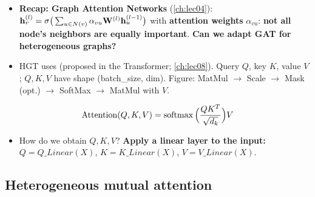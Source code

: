 \begin{itemize}
  \item \textbf{Recap: Graph Attention Networks} (\cref{ch:lec04}):
    $\mathbf{h}_v^{(l)} = \sigma\big(\sum_{u\in N(v)}\alpha_{vu}\mathbf{W}^{(l)}\mathbf{h}_u^{(l-1)}\big)$
    with \textbf{attention weights} $\alpha_{vu}$: \textbf{not all node's
    neighbors are equally important}. \textbf{Can we adapt GAT for
    heterogeneous graphs?}
  \item HGT uses  (proposed in the
    Transformer; \cref{ch:lec08}). Query $Q$, key $K$, value $V$; $Q,K,V$ have
    shape (batch\_size, dim). Figure: MatMul $\to$ Scale $\to$ Mask (opt.)
    $\to$ SoftMax $\to$ MatMul with $V$.
\end{itemize}
\begin{equation}\label{eq:lec09-sdpa}
  \mathrm{Attention}(Q,K,V) = \operatorname{softmax}\Big(\frac{QK^{T}}{\sqrt{d_k}}\Big)V
\end{equation}
\begin{itemize}
  \item How do we obtain $Q,K,V$? \textbf{Apply a linear layer to the input:}
    $Q = Q\_Linear(X)$, $K = K\_Linear(X)$, $V = V\_Linear(X)$.
\end{itemize}

\subsection{Heterogeneous mutual attention}\label{sec:lec09-mutual}

